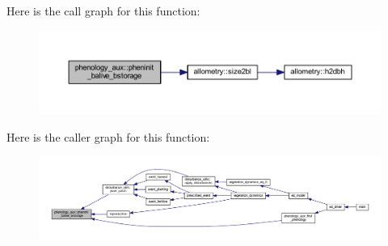 Here is the call graph for this function\+:\nopagebreak
\begin{figure}[H]
\begin{center}
\leavevmode
\includegraphics[width=350pt]{namespacephenology__aux_a678dc0aeea995ed48f816c0588d15965_cgraph}
\end{center}
\end{figure}




Here is the caller graph for this function\+:\nopagebreak
\begin{figure}[H]
\begin{center}
\leavevmode
\includegraphics[width=350pt]{namespacephenology__aux_a678dc0aeea995ed48f816c0588d15965_icgraph}
\end{center}
\end{figure}


